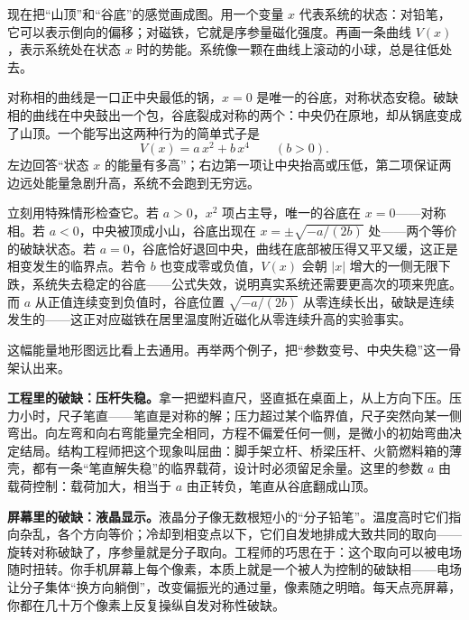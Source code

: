 \begin{mainline}
现在把“山顶”和“谷底”的感觉画成图。用一个变量 \(x\) 代表系统的状态：对铅笔，它可以表示倒向的偏移；对磁铁，它就是序参量磁化强度。再画一条曲线 \(V(x)\)，表示系统处在状态 \(x\) 时的势能。系统像一颗在曲线上滚动的小球，总是往低处去。

对称相的曲线是一口正中央最低的锅，\(x=0\) 是唯一的谷底，对称状态安稳。破缺相的曲线在中央鼓出一个包，谷底裂成对称的两个：中央仍在原地，却从锅底变成了山顶。一个能写出这两种行为的简单式子是
\[
V(x)=a\,x^{2}+b\,x^{4}\qquad (b>0).
\]
左边回答“状态 \(x\) 的能量有多高”；右边第一项让中央抬高或压低，第二项保证两边远处能量急剧升高，系统不会跑到无穷远。

立刻用特殊情形检查它。若 \(a>0\)，\(x^{2}\) 项占主导，唯一的谷底在 \(x=0\)——对称相。若 \(a<0\)，中央被顶成小山，谷底出现在 \(x=\pm\sqrt{-a/(2b)}\) 处——两个等价的破缺状态。若 \(a=0\)，谷底恰好退回中央，曲线在底部被压得又平又缓，这正是相变发生的临界点。若令 \(b\) 也变成零或负值，\(V(x)\) 会朝 \(|x|\) 增大的一侧无限下跌，系统失去稳定的谷底——公式失效，说明真实系统还需要更高次的项来兜底。而 \(a\) 从正值连续变到负值时，谷底位置 \(\sqrt{-a/(2b)}\) 从零连续长出，破缺是连续发生的——这正对应磁铁在居里温度附近磁化从零连续升高的实验事实。

这幅能量地形图远比看上去通用。再举两个例子，把“参数变号、中央失稳”这一骨架认出来。

\textbf{工程里的破缺：压杆失稳。}拿一把塑料直尺，竖直抵在桌面上，从上方向下压。压力小时，尺子笔直——笔直是对称的解；压力超过某个临界值，尺子突然向某一侧弯出。向左弯和向右弯能量完全相同，方程不偏爱任何一侧，是微小的初始弯曲决定结局。结构工程师把这个现象叫屈曲：脚手架立杆、桥梁压杆、火箭燃料箱的薄壳，都有一条“笔直解失稳”的临界载荷，设计时必须留足余量。这里的参数 \(a\) 由载荷控制：载荷加大，相当于 \(a\) 由正转负，笔直从谷底翻成山顶。

\textbf{屏幕里的破缺：液晶显示。}液晶分子像无数根短小的“分子铅笔”。温度高时它们指向杂乱，各个方向等价；冷却到相变点以下，它们自发地排成大致共同的取向——旋转对称破缺了，序参量就是分子取向。工程师的巧思在于：这个取向可以被电场随时扭转。你手机屏幕上每个像素，本质上就是一个被人为控制的破缺相——电场让分子集体“换方向躺倒”，改变偏振光的通过量，像素随之明暗。每天点亮屏幕，你都在几十万个像素上反复操纵自发对称性破缺。
\end{mainline}

